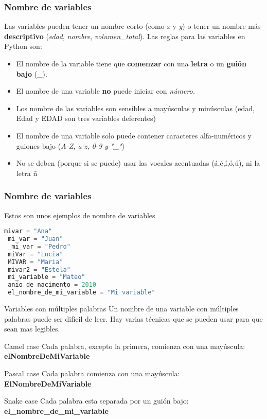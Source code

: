 \begin{frame}[fragile]
  \frametitle{Nombre de variables}

  \vspace{\baselineskip}
  Las variables pueden tener un nombre corto (como \textit{x} y \textit{y})
  o tener un nombre más \textbf{descriptivo} (\textit{edad}, \textit{nombre},
  \textit{volumen\_total}). Las reglas para las variables en Python son:
  \pausa

  \vspace{\baselineskip}
  \begin{itemize}
    \item El nombre de la variable tiene que \textbf{comenzar} con una
      \textbf{letra} o un \textbf{guión bajo} (\_).
    \pausa
    \item El nombre de una variable \textbf{no} puede iniciar con
      \textit{número.}
    \pausa
    \item Los nombre de las variables son sensibles a mayúsculas y minúsculas
      (edad, Edad y EDAD son tres variables deferentes)
    \pausa
    \item El nombre de una variable solo puede contener caracteres
      alfa-numéricos y guiones bajo (\textit{A-Z, a-z, 0-9 y "\_"})
    \pausa
    \item No se deben (porque si se puede) usar las vocales acentuadas
      (á,é,í,ó,ú), ni la letra ñ
  \end{itemize}
\end{frame}

\begin{frame}[fragile]
  \frametitle{Nombre de variables}

  Estos son unos ejemplos de nombre de variables

  \vspace{\baselineskip}
  \begin{lstlisting}[language=Python]
 mivar = "Ana"
 mi_var = "Juan"
 _mi_var = "Pedro"
 miVar = "Lucia"
 MIVAR = "Maria"
 mivar2 = "Estela"
 mi_variable = "Mateo"
 anio_de_nacimento = 2010
 el_nombre_de_mi_variable = "Mi variable"\end{lstlisting}
\end{frame}

\begin{frame}[c]{Variables con múltiples palabras}
  Un nombre de una variable con múltiples palabras puede ser difícil de leer.
  Hay varias técnicas que se pueden usar para que sean mas legibles.
  \pausa
  \begin{block}{Camel case}
    Cada palabra, excepto la primera, comienza con una mayúscula:
    \textbf{elNombreDeMiVariable}
  \end{block}
  \pausa
  \begin{block}{Pascal case}
    Cada palabra comienza con una mayúscula:
    \textbf{ElNombreDeMiVariable}
  \end{block}
  \pausa
  \begin{exampleblock}{Snake case}
    Cada palabra esta separada por un guión bajo:
    \textbf{el\_nombre\_de\_mi\_variable}
  \end{exampleblock}
\end{frame}

